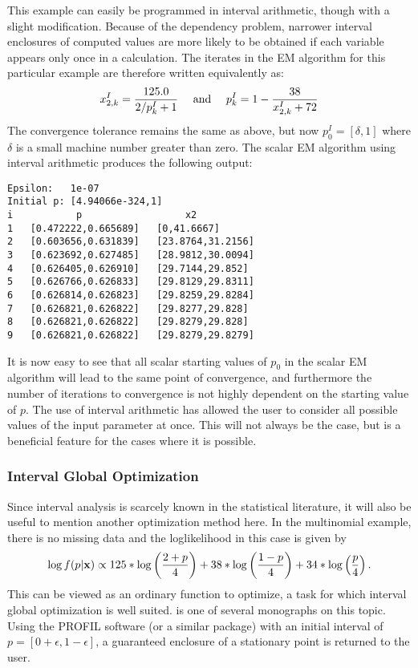 This example can easily be programmed in interval arithmetic, though with a
slight modification.  Because of the dependency problem, narrower interval
enclosures of computed values are more likely to
 be obtained if each variable appears only
once in a calculation.  The iterates in the EM algorithm for this particular
example are therefore written equivalently as:
$$
x^I_{2,k} = \frac{125.0}{2 / p_k^I+1} \mbox{ \quad and \quad}
p^I_k = 1 - \frac{38}{x_{2,k}^I + 72}
$$
The convergence tolerance remains the same as above, but now $p_0^I =
[\delta,1]$ where $\delta$ is a small machine number greater than zero.
The scalar EM algorithm
using interval arithmetic produces the following output:
\begin{verbatim}
Epsilon:   1e-07
Initial p: [4.94066e-324,1]
i           p                  x2
1   [0.472222,0.665689]   [0,41.6667]
2   [0.603656,0.631839]   [23.8764,31.2156]
3   [0.623692,0.627485]   [28.9812,30.0094]
4   [0.626405,0.626910]   [29.7144,29.852]
5   [0.626766,0.626833]   [29.8129,29.8311]
6   [0.626814,0.626823]   [29.8259,29.8284]
7   [0.626821,0.626822]   [29.8277,29.828]
8   [0.626821,0.626822]   [29.8279,29.828]
9   [0.626821,0.626822]   [29.8279,29.8279]
\end{verbatim}

It is now easy to see that all scalar 
starting values of $p_0$ in the scalar EM algorithm will lead to the
same point of convergence, and furthermore the number of iterations to
convergence is not highly dependent on the starting value of $p$.  The use of
interval arithmetic has allowed the user to consider all possible values of
the input parameter at once.  This will not always be the case, but is
a beneficial feature for the cases where it is possible.

\subsubsection{Interval Global Optimization}

Since interval analysis is scarcely known in the statistical literature, it
will also be useful to mention another optimization method here.  In the
multinomial example, there is no missing data and the
loglikelihood in this case is given by
$$
\log f(p|{\bf x}) \propto 125*\log\left(\frac{2+p}{4}\right) + 
  38*\log\left(\frac{1-p}{4}\right)
  +34*\log\left(\frac{p}{4}\right).
$$
This can be viewed as an ordinary function to optimize, a task for which
interval global optimization is well suited.  \cite{HansenBook} is one
of several monographs on this topic.  Using the PROFIL software (or
a similar package) with an initial interval of $p=[0+\epsilon,1-\epsilon]$, a guaranteed 
enclosure of a stationary point is returned to the user. 

